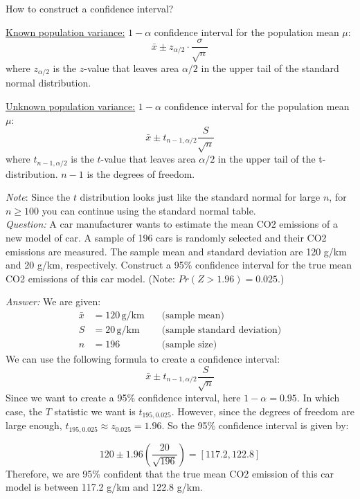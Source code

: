 \documentclass{./../../Latex/handout}
\begin{document}
\thispagestyle{plain}

How to construct a confidence interval? 

 \underline{Known population variance:} $1-\alpha$ confidence interval for the population mean $\mu$:
$$ \bar{x} \pm  z_{\alpha/2} \cdot \frac{\sigma}{\sqrt{n}} $$
where $z_{\alpha/2}$ is the $z$-value that leaves area $\alpha/2$ in the upper tail of the standard normal distribution.

\underline{Unknown population variance:} $1-\alpha$ confidence interval for the population mean $\mu$:
$$ \bar{x} \pm  t_{n-1,\alpha/2}  \frac{S}{\sqrt{n}} $$
where $t_{n-1,\alpha/2}$ is the $t$-value that leaves area $\alpha/2$ in the upper tail of the t-distribution. $n-1$ is the degrees of freedom. 

\textit{Note}: Since the $t$ distribution looks just like the standard normal for large $n$, for $n\geq 100$ you can continue using the standard normal table. \\

\newpage
\textit{Question:} A car manufacturer wants to estimate the mean CO2 emissions of a new model of car. A sample of 196 cars is randomly selected and their CO2 emissions are measured. The sample mean and standard deviation are 120 g/km and 20 g/km, respectively. Construct a 95\% confidence interval for the true mean CO2 emissions of this car model. (Note: $Pr(Z>1.96)=0.025$.)

\textit{Answer:} We are given:
\begin{align*}
\bar{x} &= 120 \, \text{g/km} \quad &\text{(sample mean)} \\
S &= 20 \, \text{g/km} \quad &\text{(sample standard deviation)} \\
n &= 196 \quad &\text{(sample size)} 
\end{align*}
We can use the following formula to create a confidence interval:
$$ \bar{x} \pm  t_{n-1,\alpha/2}  \frac{S}{\sqrt{n}} $$
Since we want to create a 95\% confidence interval, here $1-\alpha=0.95$. In which case, the $T$ statistic we want is $t_{195,0.025}$. However, since the degrees of freedom are large enough, $t_{195,0.025} \approx z_{0.025}=1.96$. So the 95\% confidence interval is given by:

\[
 120 \pm 1.96 \left( \frac{20}{\sqrt{196}} \right) =  [117.2, 122.8]
\]
Therefore, we are 95\% confident that the true mean CO2 emission of this car model is between 117.2 g/km and 122.8 g/km.
\end{document}
